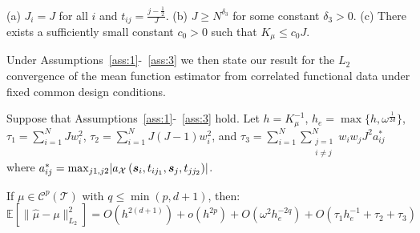 \begin{assumption}
	(a) $J_i = J$ for all $i$ and $t_{ij} = \frac{j-\frac{1}{2}}{J}$. (b) $J \geq N^{\delta_3}$ for some constant $\delta_3 > 0$. (c) There exists a sufficiently small constant $c_0 > 0$ such that $K_\mu \leq c_0 J$.
	\label{ass:3}
\end{assumption}

Under Assumptions~\ref{ass:1}-~\ref{ass:3} we then state our result for the $L_2$ convergence of the mean function estimator from correlated functional data under fixed common design conditions. 

\begin{theorem}
	Suppose that Assumptions~\ref{ass:1}-~\ref{ass:3} hold. Let $h = K_\mu^{-1}$, $h_e = \max\{h, \omega^{\frac{1}{2d}}\}$, $\tau_1 = \sum_{i=1}^{N} J w_i^2$, $\tau_2 = \sum_{i=1}^{N}J(J -1) w_i^2$, and $\tau_3 = \sum_{i=1}^N \sum_{\substack{j=1 \\ i \ne j}}^N w_i w_j J^2 a_{ij}^*$ where $a_{ij}^* = \max_{j1, j2} \lvert a_\mathcal{X}\left(\bm{{s}}_{i}, t_{ij_1}, \bm{{s}}_{j}, t_{jj_2}\right) \rvert$. 
	
	If $\mu \in \mathcal{C}^p\left( \mathcal{T} \right)$ with $q \leq \min(p, d+1)$, then:
	\begin{equation*}
		\mathbb{E}\left[ \lVert \hat{\mu} - \mu \rVert_{L_2}^2 \right] = O\left( h^{2(d+1)} \right) + o(h^{2p}) + O\left( \omega^2 h_e^{-2q} \right) + O\left( \tau_1 h_e^{-1}+ \tau_2 + \tau_3\right)
	\end{equation*}
	\label{thm:cpace_mean}
\end{theorem}


